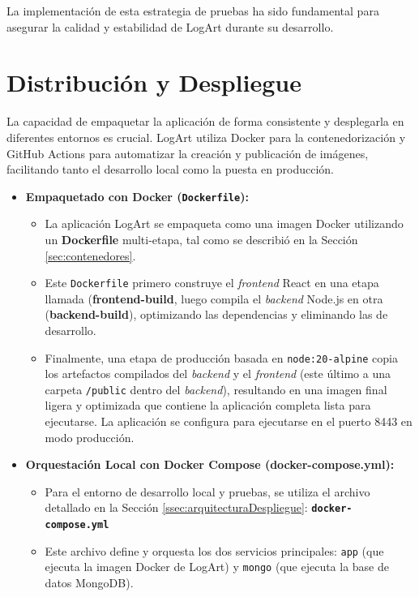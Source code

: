   La implementación de esta estrategia de pruebas ha sido fundamental para asegurar la calidad y estabilidad de LogArt durante su desarrollo.

\section{Distribución y Despliegue}
\label{sec:distribucionDespliegueCap4}

La capacidad de empaquetar la aplicación de forma consistente y desplegarla en diferentes entornos es crucial. LogArt utiliza Docker para la contenedorización y GitHub Actions para automatizar la creación y publicación de imágenes, facilitando tanto el desarrollo local como la puesta en producción.

\begin{itemize}
    \item \textbf{Empaquetado con Docker (\texttt{Dockerfile}):}
    \begin{itemize}
        \item La aplicación LogArt se empaqueta como una imagen Docker utilizando un \textbf{Dockerfile} multi-etapa, tal como se describió en la Sección \ref{sec:contenedores}.
        \item Este \texttt{Dockerfile} primero construye el \textit{frontend} React en una etapa llamada (\textbf{frontend-build}, luego compila el \textit{backend} Node.js en otra (\textbf{backend-build}), optimizando las dependencias y eliminando las de desarrollo.
        \item Finalmente, una etapa de producción basada en \texttt{node:20-alpine} copia los artefactos compilados del \textit{backend} y el \textit{frontend} (este último a una carpeta \texttt{/public} dentro del \textit{backend}), resultando en una imagen final ligera y optimizada que contiene la aplicación completa lista para ejecutarse. La aplicación se configura para ejecutarse en el puerto 8443 en modo producción.
    \end{itemize}
    \vspace{0.3cm}
    \item \textbf{Orquestación Local con Docker Compose (\textbf{docker-compose.yml}):}
    \begin{itemize}
        \item Para el entorno de desarrollo local y pruebas, se utiliza el archivo detallado en la Sección \ref{ssec:arquitecturaDespliegue}: \textbf{\texttt{docker-compose.yml}} 
        \item Este archivo define y orquesta los dos servicios principales: \texttt{app} (que ejecuta la imagen Docker de LogArt) y \texttt{mongo} (que ejecuta la base de datos MongoDB).

\end{itemize}
\end{itemize}
